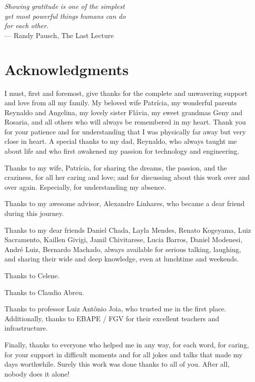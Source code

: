 
\begin{flushright}{\slshape
	Showing gratitude is one of the simplest\\
    yet most powerful things humans can do\\
    for each other.} \\ \medskip
    --- Randy Pausch, The Last Lecture
\end{flushright}

\bigskip

\begingroup
\let\clearpage\relax
\let\cleardoublepage\relax
\let\cleardoublepage\relax
\chapter*{Acknowledgments}

I must, first and foremost, give thanks for the complete and unwavering support and love from all my family. My beloved wife Patrícia, my wonderful parents Reynaldo and Angelina, my lovely sister Flávia, my sweet grandmas Geny and Rosaria, and all others who will always be remembered in my heart. Thank you for your patience and for understanding that I was physically far away but very close in heart. A special thanks to my dad, Reynaldo, who always taught me about life and who first awakened my passion for technology and engineering.

Thanks to my wife, Patrícia, for sharing the dreams, the passion, and the craziness, for all her caring and love; and for discussing about this work over and over again. Especially, for understanding my absence.

Thanks to my awesome advisor, Alexandre Linhares, who became a dear friend during this journey.

Thanks to my dear friends Daniel Chada, Layla Mendes, Renato Kogeyama, Luiz Sacramento, Kaillen Givigi, Jamil Chivitarese, Lucia Barros, Daniel Modenesi, André Luiz, Bernardo Machado, always available for serious talking, laughing, and sharing their wide and deep knowledge, even at lunchtime and weekends.

Thanks to Celene.

Thanks to Claudio Abreu.

Thanks to professor Luiz Antônio Joia, who trusted me in the first place. Additionally, thanks to EBAPE / FGV for their excellent teachers and infrastructure.

Finally, thanks to everyone who helped me in any way, for each word, for caring, for your support in difficult moments and for all jokes and talks that made my days worthwhile. Surely this work was done thanks to all of you. After all, nobody does it alone!

\bigskip


\endgroup
